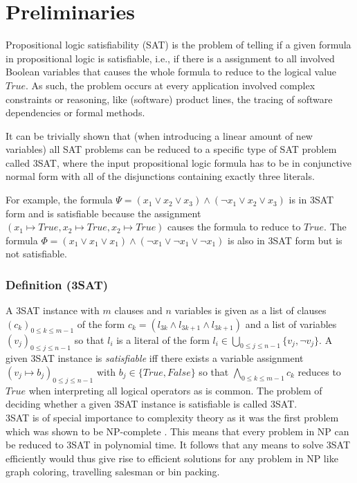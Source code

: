 \section{Preliminaries}
\label{sec:preliminaries}

Propositional logic satisfiability (SAT) is the problem of telling if a given formula in propositional logic is satisfiable, i.e., if there is a assignment to all involved Boolean variables that causes the whole formula to reduce to the logical value $\textit{True}$. As such, the problem occurs at every application involved complex constraints or reasoning, like (software) product lines, the tracing of software dependencies or formal methods.

It can be trivially shown that (when introducing a linear amount of new variables) all SAT problems can be reduced to a specific type of SAT problem called 3SAT, where the input propositional logic formula has to be in conjunctive normal form with all of the disjunctions containing exactly three literals.

For example, the formula $\Psi = ( x_{1} \vee x_{2} \vee x_{3}) \wedge ( \lnot x_{1} \vee x_{2} \vee x_{3})$ is in 3SAT form and is satisfiable because the assignment $(x_1 \mapsto \textit{True}, x_2 \mapsto \textit{True}, x_2 \mapsto \textit{True})$ causes the formula to reduce to $\textit{True}$. The formula $\Phi = ( x_{1} \vee x_{1} \vee x_{1}) \wedge ( \lnot x_{1} \vee \lnot x_{1}  \vee \lnot x_{1} )$ is also in 3SAT form but is not satisfiable.

\subsubsection{Definition (3SAT)}
A 3SAT instance with $m$ clauses and $n$ variables is given as a list of clauses $(c_k)_{0 \leq k \leq m-1}$ of the form $c_k = (l_{3k} \land l_{3k+1} \land l_{3k+1})$ and a list of variables $(v_j)_{0 \leq j \leq n-1}$ so that $l_i$ is a literal of the form $l_i \in \bigcup_{0 \leq j \leq n-1} \{v_j, \lnot v_j\}$. A given 3SAT instance is \emph{satisfiable} iff there exists a variable assignment $(v_j \mapsto b_j)_{0 \leq j \leq n-1}$ with $b_j \in \{\textit{True}, \textit{False}\}$ so that $\bigwedge_{0 \leq k \leq m-1} c_k$ reduces to $\textit{True}$ when interpreting all logical operators as is common. The problem of deciding whether a given 3SAT instance is satisfiable is called 3SAT.\\

3SAT is of special importance to complexity theory as it was the first problem which was shown to be NP-complete \cite{cook1971complexity}. This means that every problem in NP can be reduced to 3SAT in polynomial time. It follows that any means to solve 3SAT efficiently would thus give rise to efficient solutions for any problem in NP like graph coloring, travelling salesman or bin packing.

